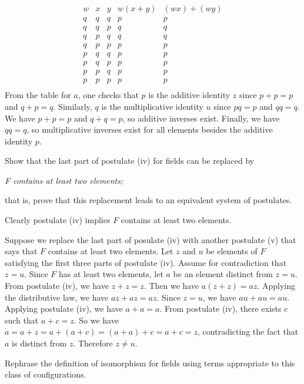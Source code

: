 \begin{solution}
\[
\begin{array}{ccccc}
    w & x & y & w(x+y) & (wx) + (wy)\\
    \hline
    q & q & q & p & p\\
    q & q & p & q & q\\
    q & p & q & q & q\\
    q & p & p & p & p\\
    p & q & q & p & p\\
    p & q & p & p & p\\
    p & p & q & p & p\\
    p & p & p & p & p\\
\end{array}
\]
From the table for $a$, one checks that $p$ is the additive identity $z$ since $p+p=p$
and $q+p=q$.
Similarly, $q$ is the multiplicative identity $u$ since $pq=p$ and $qq=q$.
We have $p+p=p$ and $q+q=p$, so additive inverses exist.
Finally, we have $qq=q$, so multiplicative inverses exist for all elements besides the additive identity $p$.
\end{solution}

\begin{exercise}
Show that the last part of postulate (iv) for fields can be replaced by
\begin{center}
    \textit{F contains at least two elements;}
\end{center}
that is, prove that this replacement leads to an equivalent system of postulates.
\end{exercise}

\begin{solution}
Clearly postulate (iv) implies $F$ contains at least two elements.

Suppose we replace the last part of posulate (iv) with another postulate (v) that
says that $F$ contains at least two elements.
Let $z$ and $u$ be elements of $F$ satisfying the first three parts of postulate (iv).
Assume for contradiction that $z=u$.
Since $F$ has at least two elements, let $a$ be an element distinct from $z=u$.
From postulate (iv), we have $z+z=z$.
Then we have $a(z+z)=az$. Applying the distributive law, we have $az+az=az$.
Since $z=u$, we have $au+au=au$. Applying postulate (iv), we have $a+a=a$.
From postulate (iv), there exists $c$ such that $a+c=z$.
So we have $a=a+z=a+(a+c)=(a+a)+c=a+c=z$, contradicting the fact that $a$ is distinct from $z$.
Therefore $z\neq u$.
\end{solution}

\begin{exercise}
Rephrase the definition of isomorphism for fields using terms appropriate to this
class of configurations.
\end{exercise}

